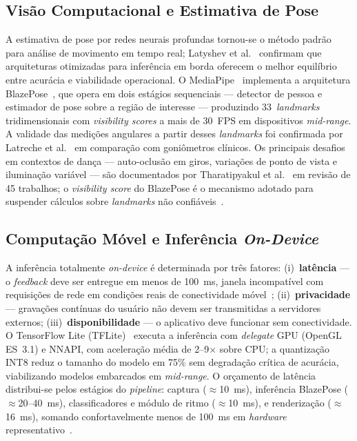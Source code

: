 \subsection{Visão Computacional e Estimativa de Pose}
\label{sub:visao}

A estimativa de pose por redes neurais profundas tornou-se o método padrão
para análise de movimento em tempo real; Latyshev et
al.~\cite{latyshev2024computer} confirmam que arquiteturas otimizadas para
inferência em borda oferecem o melhor equilíbrio entre acurácia e viabilidade
operacional. O MediaPipe~\cite{lugaresi2019mediapipe} implementa a arquitetura
BlazePose~\cite{bazarevsky2020blazeposeondevicerealtimebody}, que opera em dois
estágios sequenciais --- detector de pessoa e estimador de pose sobre a região
de interesse --- produzindo 33~\textit{landmarks} tridimensionais com
\textit{visibility scores} a mais de 30~FPS em dispositivos \textit{mid-range}.
A validade das medições angulares a partir desses \textit{landmarks} foi
confirmada por Latreche et al.~\cite{LATRECHE2023112826} em comparação com
goniômetros clínicos. Os principais desafios em contextos de dança ---
auto-oclusão em giros, variações de ponto de vista e iluminação variável ---
são documentados por Tharatipyakul et al.~\cite{THARATIPYAKUL2024e36589} em
revisão de 45 trabalhos; o \textit{visibility score} do BlazePose é o
mecanismo adotado para suspender cálculos sobre \textit{landmarks} não
confiáveis~\cite{bora2023real}.

\subsection{Computação Móvel e Inferência \textit{On-Device}}
\label{subsub:otimizacao}

A inferência totalmente \textit{on-device} é determinada por três fatores:
(i)~\textbf{latência} --- o \textit{feedback} deve ser entregue em menos de
100~ms, janela incompatível com requisições de rede em condições reais de
conectividade móvel~\cite{li2020edgeai}; (ii)~\textbf{privacidade} ---
gravações contínuas do usuário não devem ser transmitidas a servidores
externos; (iii)~\textbf{disponibilidade} --- o aplicativo deve funcionar sem
conectividade. O TensorFlow Lite (TFLite)~\cite{lee2019ondevice} executa a
inferência com \textit{delegate} GPU (OpenGL ES~3.1) e NNAPI, com aceleração
média de 2--9$\times$ sobre CPU; a quantização INT8 reduz o tamanho do modelo
em 75\% sem degradação crítica de acurácia, viabilizando modelos embarcados em
\textit{mid-range}. O orçamento de latência distribui-se pelos estágios do
\textit{pipeline}: captura ($\approx$10~ms), inferência BlazePose
($\approx$20--40~ms), classificadores e módulo de ritmo ($\approx$10~ms), e
renderização ($\approx$16~ms), somando confortavelmente menos de 100~ms em
\textit{hardware} representativo~\cite{zhang2020mobipose}.

